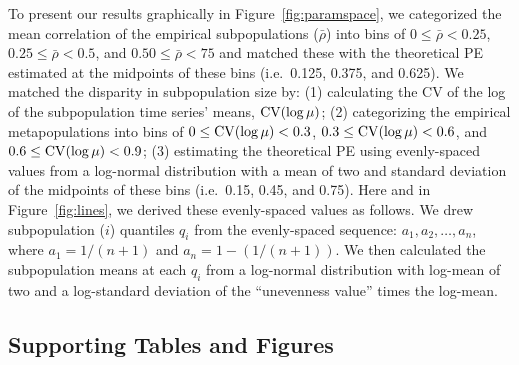 To present our results graphically in Figure~\ref{fig:paramspace}, we categorized
the mean correlation of the empirical subpopulations ($\bar{\rho}$) into bins of
$0 \le \bar{\rho} < 0.25$, $0.25 \le \bar{\rho} < 0.5$, and $0.50 \le \bar{\rho}
< 75$ and matched these with the theoretical PE estimated at the midpoints of
these bins (i.e.\ 0.125, 0.375, and 0.625).  We matched the disparity in
subpopulation size by: (1) calculating the CV of the log of the subpopulation
time series' means, $\mathrm{CV}(\log\mu)$; (2) categorizing the empirical
metapopulations into bins of $0 \le \mathrm{CV}(\log\mu) < 0.3$, $0.3 \le \mathrm{CV}(\log\mu) <
0.6$, and $0.6 \le \mathrm{CV}(\log\mu) < 0.9$; (3) estimating the theoretical PE using
evenly-spaced values from a log-normal distribution with a mean of two and
standard deviation of the midpoints of these bins (i.e.\ 0.15, 0.45, and 0.75).
Here and in Figure~\ref{fig:lines}, we derived these evenly-spaced values as
follows.
We drew subpopulation ($i$) quantiles $q_i$ from the evenly-spaced sequence:
$a_1, a_2, \ldots, a_n$, where $a_1 = 1/(n+1)$ and $a_n = 1-(1/(n+1))$. We then
calculated the subpopulation means at each $q_i$ from a log-normal distribution
with log-mean of two and a log-standard deviation of the ``unevenness value''
times the log-mean.

\renewcommand{\baselinestretch}{\tighttextstretch} %
\normalsize


\clearpage
\renewcommand{\baselinestretch}{\textstretch} %
\normalsize



\subsection{Supporting Tables and Figures}

\begin{landscape}


  
\end{landscape}
\clearpage


\clearpage

\clearpage

